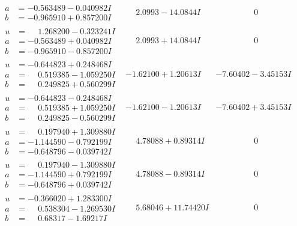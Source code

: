 \documentclass[1p]{elsarticle_modified}
\theoremstyle{definition}
\begin{document}
$$\begin{array}{c|c|c}
\begin{aligned}
a &= -0.563489 - 0.040982 I \\
b &= -0.965910 + 0.857200 I\end{aligned}
 & \phantom{-}2.0993 - 14.0844 I & \phantom{-0.000000 } 0 \\ \hline\begin{aligned}
u &= \phantom{-}1.268200 - 0.323241 I \\
a &= -0.563489 + 0.040982 I \\
b &= -0.965910 - 0.857200 I\end{aligned}
 & \phantom{-}2.0993 + 14.0844 I & \phantom{-0.000000 } 0 \\ \hline\begin{aligned}
u &= -0.644823 + 0.248468 I \\
a &= \phantom{-}0.519385 - 1.059250 I \\
b &= \phantom{-}0.249825 + 0.560299 I\end{aligned}
 & -1.62100 + 1.20613 I & -7.60402 - 3.45153 I \\ \hline\begin{aligned}
u &= -0.644823 - 0.248468 I \\
a &= \phantom{-}0.519385 + 1.059250 I \\
b &= \phantom{-}0.249825 - 0.560299 I\end{aligned}
 & -1.62100 - 1.20613 I & -7.60402 + 3.45153 I \\ \hline\begin{aligned}
u &= \phantom{-}0.197940 + 1.309880 I \\
a &= -1.144590 - 0.792199 I \\
b &= -0.648796 - 0.039742 I\end{aligned}
 & \phantom{-}4.78088 + 0.89314 I & \phantom{-0.000000 } 0 \\ \hline\begin{aligned}
u &= \phantom{-}0.197940 - 1.309880 I \\
a &= -1.144590 + 0.792199 I \\
b &= -0.648796 + 0.039742 I\end{aligned}
 & \phantom{-}4.78088 - 0.89314 I & \phantom{-0.000000 } 0 \\ \hline\begin{aligned}
u &= -0.366020 + 1.283300 I \\
a &= \phantom{-}0.538304 - 1.269530 I \\
b &= \phantom{-}0.68317 - 1.69217 I\end{aligned}
 & \phantom{-}5.68046 + 11.74420 I & \phantom{-0.000000 } 0 \\ \hline\begin{aligned}

\end{aligned}
\end{array}$$
\end{document}
